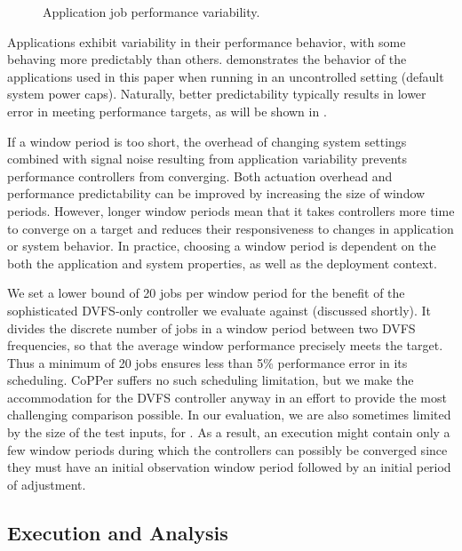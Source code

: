 \begin{figure}[tb]
  
  \caption{Application job performance variability.}
  \label{fig:copper-variation}
\end{figure}

Applications exhibit variability in their performance behavior, with some behaving more predictably than others.
 demonstrates the behavior of the applications used in this paper when running in an uncontrolled setting (default system power caps).
Naturally, better predictability typically results in lower error in meeting performance targets, as will be shown in .

If a window period is too short, the overhead of changing system settings combined with signal noise resulting from application variability prevents performance controllers from converging.
Both actuation overhead and performance predictability can be improved by increasing the size of window periods.
However, longer window periods mean that it takes controllers more time to converge on a target and reduces their responsiveness to changes in application or system behavior.
In practice, choosing a window period is dependent on the both the application and system properties, as well as the deployment context.

We set a lower bound of 20 jobs per window period for the benefit of the sophisticated DVFS-only controller we evaluate against (discussed shortly).
It divides the discrete number of jobs in a window period between two DVFS frequencies, so that the average window performance precisely meets the target.
Thus a minimum of 20 jobs ensures less than 5\% performance error in its scheduling.
CoPPer suffers no such scheduling limitation, but we make the accommodation for the DVFS controller anyway in an effort to provide the most challenging comparison possible.
In our evaluation, we are also sometimes limited by the size of the test inputs, \eg for .
As a result, an execution might contain only a few window periods during which the controllers can possibly be converged since they must have an initial observation window period followed by an initial period of adjustment.


\subsection{Execution and Analysis}
\label{sec:copper-analysis}

